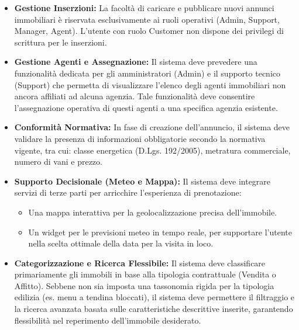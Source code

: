 \begin{itemize}
    \item \textbf{Gestione Inserzioni:} La facoltà di caricare e pubblicare nuovi annunci immobiliari 
    è riservata esclusivamente ai ruoli operativi (Admin, Support, Manager, Agent). L'utente con ruolo 
    Customer non dispone dei privilegi di scrittura per le inserzioni.

    \item \textbf{Gestione Agenti e Assegnazione:} Il sistema deve prevedere una funzionalità dedicata 
    per gli amministratori (Admin) e il supporto tecnico (Support) che permetta di visualizzare l'elenco 
    degli agenti immobiliari non ancora affiliati ad alcuna agenzia. Tale funzionalità deve consentire 
    l'assegnazione operativa di questi agenti a una specifica agenzia esistente.

    \item \textbf{Conformità Normativa:} In fase di creazione dell'annuncio, il sistema deve validare 
    la presenza di informazioni obbligatorie secondo la normativa vigente, tra cui: classe energetica 
    (D.Lgs. 192/2005), metratura commerciale, numero di vani e prezzo.

    \item \textbf{Supporto Decisionale (Meteo e Mappa):} Il sistema deve integrare servizi di terze 
    parti per arricchire l'esperienza di prenotazione:
    \begin{itemize}
        \item Una mappa interattiva per la geolocalizzazione precisa dell'immobile.
        \item Un widget per le previsioni meteo in tempo reale, per supportare l'utente nella scelta 
        ottimale della data per la visita in loco.
    \end{itemize}

    \item \textbf{Categorizzazione e Ricerca Flessibile:} Il sistema deve classificare primariamente 
    gli immobili in base alla tipologia contrattuale (Vendita o Affitto). Sebbene non sia imposta una 
    tassonomia rigida per la tipologia edilizia (es. menu a tendina bloccati), il sistema deve permettere 
    il filtraggio e la ricerca avanzata basata sulle caratteristiche descrittive inserite, garantendo 
    flessibilità nel reperimento dell'immobile desiderato.
\end{itemize}

